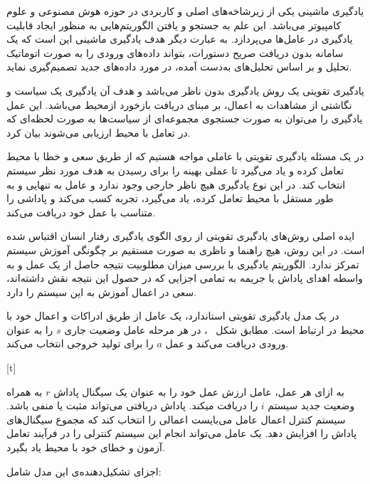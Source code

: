 
یادگیری ماشینی یکی از زیرشاخه‌های اصلی و کاربردی در حوزه هوش مصنوعی و علوم کامپیوتر می‌باشد. این علم به جستجو و یافتن الگوریتم‌هایی به منظور ایجاد قابلیت یادگیری در عامل‌ها می‌پردازد. به عبارت دیگر هدف یادگیری ماشینی این است که یک سامانه بدون دریافت صریح دستورات، بتواند داده‌های ورودی را به صورت اتوماتیک تحلیل و بر اساس تحلیل‌های به‌دست آمده، در مورد داده‌های جدید
تصمیم‌گیری نماید.


یادگیری تقویتی یک روش یادگیری بدون ناظر می‌باشد و هدف آن یادگیری یک سیاست و نگاشتی از مشاهدات به اعمال، بر مبنای دریافت بازخورد ازمحیط می‌باشد. این عمل یادگیری را می‌توان به صورت جستجوی مجموعه‌ای از سیاست‌ها به صورت لحظه‌ای که در تعامل با محیط ارزیابی می‌شوند بیان کرد.

در یک مسئله یادگیری تقویتی با عاملی مواجه هستیم که از طریق سعی و خطا با محیط تعامل کرده و یاد می‌گیرد تا عملی بهینه را برای رسیدن به هدف مورد نظر سیستم انتخاب کند. در این نوع یادگیری هیچ ناظر خارجی وجود ندارد و عامل به تنهایی و به طور مستقل با محیط تعامل کرده، یاد می‌گیرد، تجربه کسب
می‌کند و پاداشی را متناسب با عمل خود دریافت می‌کند.

ایده اصلی روش‌های یادگیری تقویتی از روی الگوی یادگیری رفتار انسان اقتباس شده است. در این
روش، هیچ راهنما و ناظری به صورت مستقیم بر چگونگی آموزش سیستم تمرکز ندارد. الگوریتم یادگیری با بررسی میزان مطلوبیت نتیجه حاصل از یک عمل و به واسطه اهدای پاداش یا جریمه به تمامی اجزایی که در
حصول این نتیجه نقش داشته‌اند، سعی در اعمال آموزش به این سیستم را دارد.


در یک مدل یادگیری تقویتی استاندارد، یک عامل از طریق ادراکات و اعمال خود با محیط در ارتباط
است. مطابق شکل ~، در هر مرحله عامل وضعیت جاری $s$ را به عنوان ورودی دریافت می‌کند و عمل $a$ را برای تولید خروجی انتخاب می‌کند.

[t]

به ازای هر عمل، عامل ارزش عمل خود را به عنوان یک سیگنال پاداش
$r$ به همراه وضعیت جدید سیستم $i$ را دریافت میکند. پاداش دریافتی می‌تواند مثبت یا منفی باشد. سیستم  کنترل اعمال عامل می‌بایست اعمالی را انتخاب کند که مجموع سیگنال‌های پاداش را افزایش دهد. یک عامل
می‌تواند انجام این سیستم کنترلی را در فرآیند تعامل آزمون و خطای خود با محیط یاد بگیرد.

اجزای تشکیل‌دهنده‌ی این مدل شامل:

